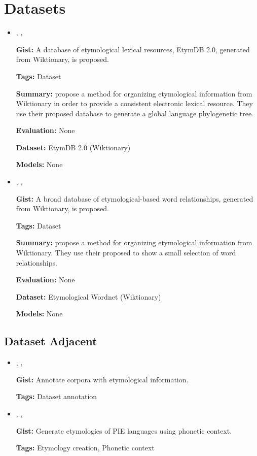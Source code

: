 \documentclass{article}[a4paper]
\newcommand{\bitem}[2]{
    \item[\cite{#1}]
        \textbf{\citetitle{#1}}, \citeauthor{#1}, \citeyear{#1}
        \newline\newline
        {#2}
}%
\begin{document}
\tableofcontents

\section{Datasets}
\begin{itemize}
    \bitem{fourrier_methodological_2020}%
    {%
        \textbf{Gist:}
        A database of etymological lexical resources, EtymDB 2.0, generated from
        Wiktionary, is proposed.

        \textbf{Tags:}
        Dataset

        \textbf{Summary:}
        \citeauthor{fourrier_methodological_2020} propose a method for
        organizing etymological information from Wiktionary in order to provide
        a consistent electronic lexical resource. They use their proposed
        database to generate a global language phylogenetic tree.

        \textbf{Evaluation:}
        None

        \textbf{Dataset:}
        EtymDB 2.0 (Wiktionary)

        \textbf{Models:}
        None
    }%

    \bitem{demelo_etymological_2014}%
    {%
        \textbf{Gist:}
        A broad database of etymological-based word relationships, generated
        from Wiktionary, is proposed.

        \textbf{Tags:}
        Dataset

        \textbf{Summary:}
        \citeauthor{demelo_etymological_2014} propose a method for organizing
        etymological information from Wiktionary. They use their proposed
        to show a small selection of word relationships.

        \textbf{Evaluation:}
        None

        \textbf{Dataset:}
        Etymological Wordnet (Wiktionary)

        \textbf{Models:}
        None
    }%
\end{itemize}

\subsection{Dataset Adjacent}
\begin{itemize}
    \bitem{dash_designing_2013}%
    {%
        \textbf{Gist:}
        Annotate corpora with etymological information.

        \textbf{Tags:}
        Dataset annotation
    }%

    \bitem{pyysalo_proto_2017}%
    {%
        \textbf{Gist:}
        Generate etymologies of PIE languages using phonetic context.

        \textbf{Tags:}
        Etymology creation, Phonetic context
    }%
\end{itemize}
\end{document}
